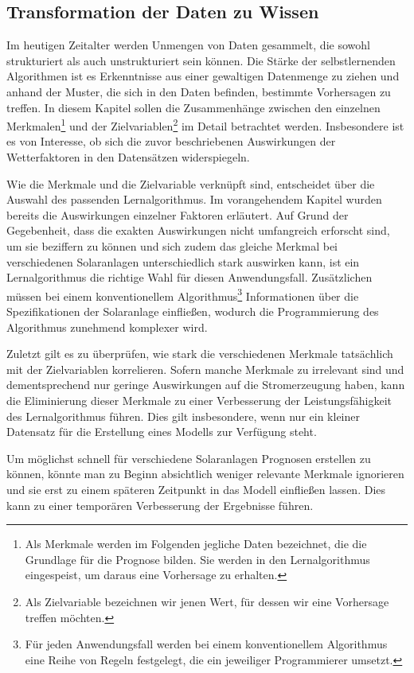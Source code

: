 \documentclass[12pt, a4paper]{article}
\begin{document}
\subsection{Transformation der Daten zu Wissen}

Im heutigen Zeitalter werden Unmengen von Daten gesammelt, die sowohl strukturiert als auch unstrukturiert sein können. Die Stärke der selbstlernenden Algorithmen ist es Erkenntnisse aus einer gewaltigen Datenmenge zu ziehen und anhand der Muster, die sich in den Daten befinden, bestimmte Vorhersagen zu treffen. In diesem Kapitel sollen die Zusammenhänge zwischen den einzelnen Merkmalen\footnote{Als Merkmale werden im Folgenden jegliche Daten bezeichnet, die die Grundlage für die Prognose bilden. Sie werden in den Lernalgorithmus eingespeist, um daraus eine Vorhersage zu erhalten.} und der Zielvariablen\footnote{Als Zielvariable bezeichnen wir jenen Wert, für dessen wir eine Vorhersage treffen möchten.} im Detail betrachtet werden. Insbesondere ist es von Interesse, ob sich die zuvor beschriebenen Auswirkungen der Wetterfaktoren in den Datensätzen widerspiegeln.

Wie die Merkmale und die Zielvariable verknüpft sind, entscheidet über die Auswahl des passenden Lernalgorithmus. Im vorangehendem Kapitel wurden bereits die Auswirkungen einzelner Faktoren erläutert. Auf Grund der Gegebenheit, dass die exakten Auswirkungen nicht umfangreich erforscht sind, um sie beziffern zu können und sich zudem das gleiche Merkmal bei verschiedenen Solaranlagen unterschiedlich stark auswirken kann, ist ein Lernalgorithmus die richtige Wahl für diesen Anwendungsfall. Zusätzlichen müssen bei einem konventionellem Algorithmus\footnote{Für jeden Anwendungsfall werden bei einem konventionellem Algorithmus eine Reihe von Regeln festgelegt, die ein jeweiliger Programmierer umsetzt.} Informationen über die Spezifikationen der Solaranlage einfließen, wodurch die Programmierung des Algorithmus zunehmend komplexer wird.

Zuletzt gilt es zu überprüfen, wie stark die verschiedenen Merkmale tatsächlich mit der Zielvariablen korrelieren. Sofern manche Merkmale zu irrelevant sind und dementsprechend nur geringe Auswirkungen auf die Stromerzeugung haben, kann die Eliminierung dieser Merkmale zu einer Verbesserung der Leistungsfähigkeit des Lernalgorithmus führen. Dies gilt insbesondere, wenn nur ein kleiner Datensatz für die Erstellung eines Modells zur Verfügung steht. 

Um möglichst schnell für verschiedene Solaranlagen Prognosen erstellen zu können, könnte man zu Beginn absichtlich weniger relevante Merkmale ignorieren und sie erst zu einem späteren Zeitpunkt in das Modell einfließen lassen. Dies kann zu einer temporären Verbesserung der Ergebnisse führen.
\end{document}
